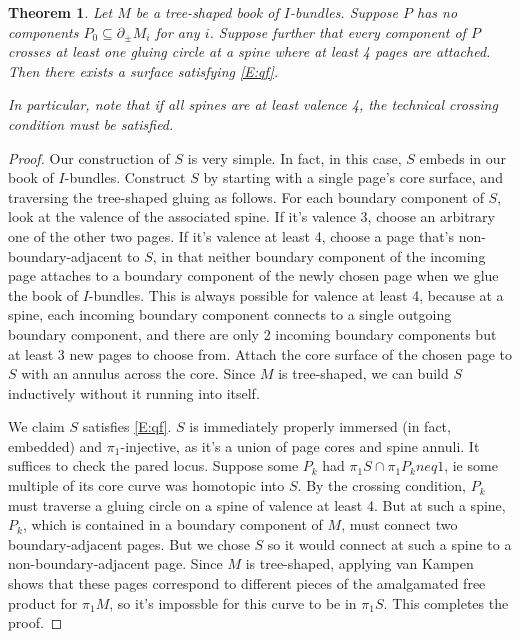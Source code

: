 \documentclass[12pt]{amsart}
\newtheorem{thm}[theorem]{Theorem}
\theoremstyle{definition}
\theoremstyle{remark}
\newcommand{\bd}{\partial}
\newcommand{\cin}{\subseteq}
\begin{document}
\begin{thm}

Let $M$ be a tree-shaped book of $I$-bundles. Suppose $P$ has no components
$P_0 \cin \bd_\pm M_i$ for any $i$. Suppose further that every
component of $P$ crosses at least one gluing circle at a spine where at least
4 pages are attached. Then there exists a surface satisfying \eqref{E:qf}.

In particular, note that if all spines are at least valence 4, the technical
crossing condition must be satisfied.

\end{thm}
\begin{proof}

Our construction of $S$ is very simple. In fact, in this case, $S$ embeds in
our book of $I$-bundles. Construct $S$ by starting with a single page's core
surface, and traversing the tree-shaped gluing as follows. For each boundary
component of $S$, look at the valence of the associated spine. If it's valence
3, choose an arbitrary one of the other two pages. If it's valence at least 4,
choose a page that's non-boundary-adjacent to $S$, in that neither boundary
component of the incoming page attaches to a boundary component of the newly
chosen page when we glue the book of $I$-bundles. This is always possible for
valence at least 4, because at a spine, each incoming boundary component
connects to a single outgoing boundary component, and there are only 2 incoming
boundary components but at least 3 new pages to choose from. Attach the core
surface of the chosen page to $S$ with an annulus across the core. Since $M$ is
tree-shaped, we can build $S$ inductively without it running into itself.

We claim $S$ satisfies \eqref{E:qf}. $S$ is immediately properly immersed (in
fact, embedded) and $\pi_1$-injective, as it's a union of page cores and spine
annuli. It suffices to check the pared locus. Suppose some $P_k$ had $\pi_1S
\cap \pi_1P_k neq 1$, ie some multiple of its core curve was homotopic into
$S$. By the crossing condition, $P_k$ must traverse a gluing circle on a spine
of valence at least 4.  But at such a spine, $P_k$, which is contained in
a boundary component of $M$, must connect two boundary-adjacent pages. But we
chose $S$ so it would connect at such a spine to a non-boundary-adjacent page.
Since $M$ is tree-shaped, applying van Kampen shows that these pages correspond
to different pieces of the amalgamated free product for $\pi_1M$, so it's
impossble for this curve to be in $\pi_1S$. This completes the proof.

\end{proof}
\end{document}
